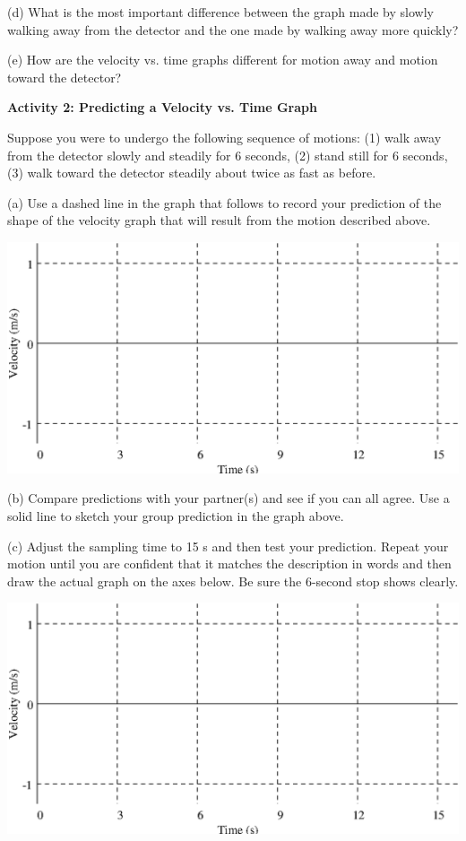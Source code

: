(d) What is the most important difference between the graph made by slowly walking
away from the detector and the one made by walking away more quickly? 
\vspace{20mm}

(e) How are the velocity vs. time graphs different for motion away and motion
toward the detector?
\vspace{20mm}

\textbf{Activity 2: Predicting a Velocity vs. Time Graph }

Suppose you were to undergo the following sequence of motions: (1) walk away
from the detector slowly and steadily for 6 seconds, (2) stand still for 6 seconds,
(3) walk toward the detector steadily about twice as fast as before.

(a) Use a dashed line in the graph that follows to record your prediction of
the shape of the velocity graph that will result from the motion described above.

\vspace{0.3cm}
{\par\centering \includegraphics{velocity/velocity_fig2.eps} \par}
\vspace{0.3cm}

(b) Compare predictions with your partner(s) and see if you can all agree. Use
a solid line to sketch your group prediction in the graph above.

(c) Adjust the sampling time to 15 s and then test your prediction. Repeat your
motion until you are confident that it matches the description in words and
then draw the actual graph on the axes below. Be sure the 6-second stop shows
clearly.

\vspace{0.3cm}
{\par\centering \includegraphics{velocity/velocity_fig2.eps} \par}
\vspace{0.3cm}

